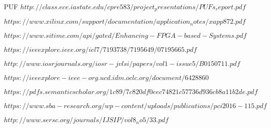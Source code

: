 \documentclass[a4paper,12pt]{report}
\begin{document}
PUF
$http://class.ece.iastate.edu/cpre583/project_presentations/PUFs_report.pdf$

$https://www.xilinx.com/support/documentation/application_notes/xapp872.pdf$ 

$https://www.sitime.com/api/gated/Enhancing-FPGA-based-Systems.pdf$

$https://ieeexplore.ieee.org/iel7/7193738/7195649/07195665.pdf$

$http://www.iosrjournals.org/iosr-jvlsi/papers/vol1-issue5/B0150711.pdf$

$https://ieeexplore-ieee-org.ucd.idm.oclc.org/document/6428860$

$https://pdfs.semanticscholar.org/1c89/7c820df0eec74821c57736d936cb8a11b2de.pdf$

$https://www.sba-research.org/wp-content/uploads/publications/pci2016-115.pdf$

$http://www.sersc.org/journals/IJSIP/vol8_no5/33.pdf$
\end{document}
